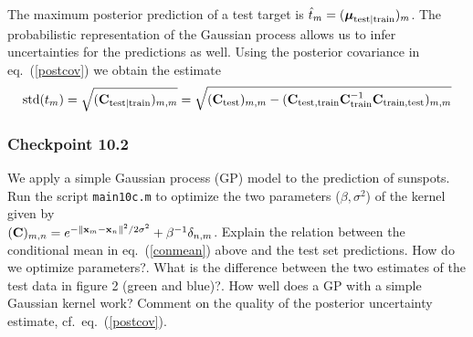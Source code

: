 \documentclass[12pt]{article}    %
\def\xb{{\bf x}}
\def\mub{\text{\boldmath $\mu$}}
\def\Cb{{\bf C}}
\begin{document}
The maximum posterior prediction of a test target is  $\hat{t}_m =(\mub_{{\rm test}|{\rm train}})_m$.
The probabilistic representation of the Gaussian process allows us to infer uncertainties for the predictions as well. Using the posterior covariance in eq.\
(\ref{postcov}) we obtain the estimate
\begin{equation}
{\rm std}(t_m)   =\sqrt{ (\Cb_{{\rm test}|{\rm train}})_{m,m}} = \sqrt{(\Cb_{\rm test})_{m,m} - (\Cb_{{\rm test},{\rm train}}\Cb_{\rm train}^{-1}\Cb_{{\rm train},{\rm test}})_{m,m} } \label{postcov}
\end{equation}


\subsubsection*{Checkpoint 10.2}
We apply a simple Gaussian process (GP) model to the prediction of sunspots. Run the script {\tt main10c.m} to optimize the two parameters ($\beta, \sigma^2$)
of the kernel given by\\ $(\Cb)_{m,n} = e^{ -\| \xb_m -\xb_n \|^2/2\sigma^2 } + \beta^{-1}\delta_{n,m}$. Explain the relation between the conditional
mean in eq.\ (\ref{conmean}) above and the test set predictions. How do we optimize parameters?. What is the difference between the two estimates of the test data in figure 2 (green and blue)?.
How well does a GP with a simple Gaussian kernel work? Comment on the quality of the posterior uncertainty estimate, cf.\ eq.\ (\ref{postcov}).
\end{document}
